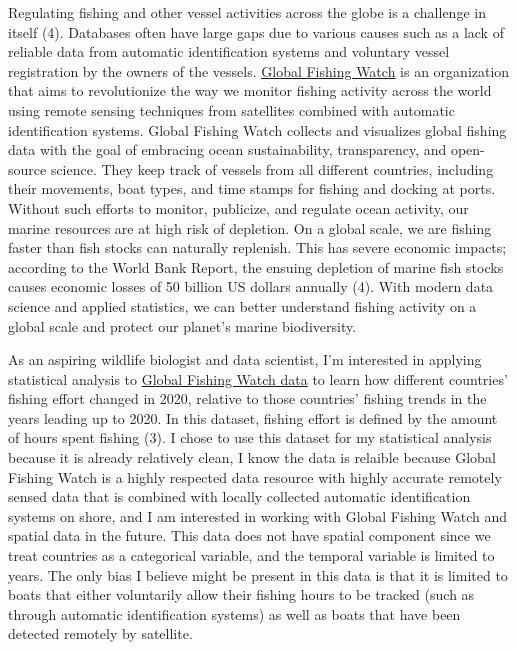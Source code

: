 \documentclass[
]{article}
\begin{document}
Regulating fishing and other vessel activities across the globe is a
challenge in itself (4). Databases often have large gaps due to various
causes such as a lack of reliable data from automatic identification
systems and voluntary vessel registration by the owners of the vessels.
\href{https://globalfishingwatch.org/}{Global Fishing Watch} is an
organization that aims to revolutionize the way we monitor fishing
activity across the world using remote sensing techniques from
satellites combined with automatic identification systems. Global
Fishing Watch collects and visualizes global fishing data with the goal
of embracing ocean sustainability, transparency, and open-source
science. They keep track of vessels from all different countries,
including their movements, boat types, and time stamps for fishing and
docking at ports. Without such efforts to monitor, publicize, and
regulate ocean activity, our marine resources are at high risk of
depletion. On a global scale, we are fishing faster than fish stocks can
naturally replenish. This has severe economic impacts; according to the
World Bank Report, the ensuing depletion of marine fish stocks causes
economic losses of 50 billion US dollars annually (4). With modern data
science and applied statistics, we can better understand fishing
activity on a global scale and protect our planet's marine biodiversity.

As an aspiring wildlife biologist and data scientist, I'm interested in
applying statistical analysis to
\href{https://globalfishingwatch.org/datasets-and-code/}{Global Fishing
Watch data} to learn how different countries' fishing effort changed in
2020, relative to those countries' fishing trends in the years leading
up to 2020. In this dataset, fishing effort is defined by the amount of
hours spent fishing (3). I chose to use this dataset for my statistical
analysis because it is already relatively clean, I know the data is
relaible because Global Fishing Watch is a highly respected data
resource with highly accurate remotely sensed data that is combined with
locally collected automatic identification systems on shore, and I am
interested in working with Global Fishing Watch and spatial data in the
future. This data does not have spatial component since we treat
countries as a categorical variable, and the temporal variable is
limited to years. The only bias I believe might be present in this data
is that it is limited to boats that either voluntarily allow their
fishing hours to be tracked (such as through automatic identification
systems) as well as boats that have been detected remotely by satellite.
\end{document}
